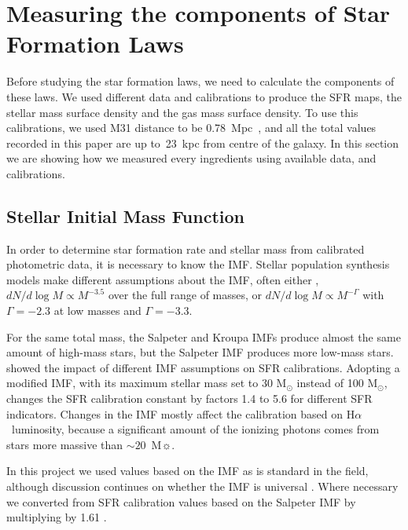 \documentclass[useAMS,usenatbib]{mn2e}
\newcommand \halpha    {H$\alpha $\ }
\begin{document}
\section{Measuring the components of Star Formation Laws}
Before studying the star formation laws, we need to calculate the components of these laws. We used different data and calibrations to produce the SFR maps, the stellar mass surface density and the gas mass surface density. To use this calibrations, we used M31 distance to be 0.78~Mpc~\cite{McConnachie05}, and all the total values recorded in this paper are up to~23~kpc from centre of the galaxy. In this section we are showing how we measured every ingredients using available data, and calibrations. 

\subsection{Stellar Initial Mass Function}%
\label{sec: imf}

In order to determine star formation rate and stellar mass from calibrated photometric data, it is necessary to know the IMF. 
Stellar population synthesis models make different assumptions about the IMF, often either  \cite{Salpeter55},
$ dN / d \log M \propto M^{-3.5 }$ over the full range of masses, or \cite{Kroupa01} $ dN / d \log M \propto M^{-\Gamma }$ 
with $\Gamma=-2.3$ at low masses and  $\Gamma=-3.3$.

For the same total mass, the Salpeter and Kroupa IMFs produce almost the same amount of high-mass stars, but the Salpeter IMF produces more low-mass stars.  \cite{Calzetti12} showed the impact of different IMF assumptions on SFR calibrations. Adopting a modified \cite{Kroupa01} IMF, with its maximum stellar mass set to 30 M$_{\odot}$ instead of 100 M$_{\odot}$, changes the SFR calibration constant by factors 1.4 to 5.6 for different SFR indicators. Changes in the IMF mostly affect the calibration based on \halpha luminosity, because a significant amount of the ionizing photons comes from stars more massive than $\sim 20$~M$\sun$. 

In this project we used values based on the \cite{Kroupa01} IMF as is standard in the field, although discussion continues on whether the IMF is universal \citep{Bastin10}. Where necessary we converted from SFR calibration values based on the Salpeter IMF by multiplying by 1.61  \citep{Madau14}.
\end{document}
